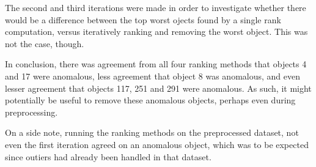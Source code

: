\documentclass[a4paper]{article}
\begin{document}
The second and third iterations were made in order to investigate whether there would be a difference between the top worst ojects found by a single rank computation, versus iteratively ranking and removing the worst object. This was not the case, though.

In conclusion, there was agreement from all four ranking methods that objects 4 and 17 were anomalous, less agreement that object 8 was anomalous, and even lesser agreement that objects 117, 251 and 291 were anomalous. As such, it might potentially be useful to remove these anomalous objects, perhaps even during preprocessing.

On a side note, running the ranking methods on the preprocessed dataset, not even the first iteration agreed on an anomalous object, which was to be expected since outiers had already been handled in that dataset.
\end{document}
